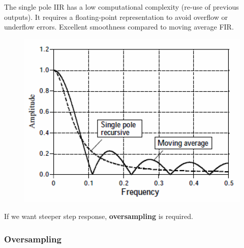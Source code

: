 \begin{minipage}{0.5 \linewidth}
The single pole IIR has a low computational complexity
(re-use of previous outputs). It requires a floating-point
representation to avoid overflow or underflow errors. Excellent smoothness compared to moving average FIR.

\end{minipage}\hfill
\begin{minipage}{0.5 \linewidth}

\begin{figure}[H]
    \centering
    \includegraphics[width = \textwidth]{L6/img/single-pole.PNG}
\end{figure}

\end{minipage}

If we want steeper step response, \textbf{oversampling} is required.

\subsubsection{Oversampling}

